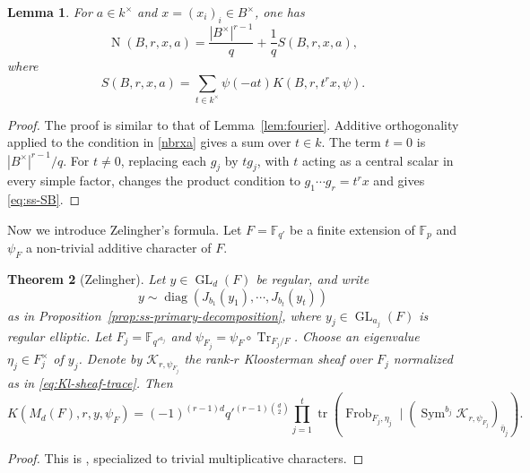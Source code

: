 \documentclass[11pt]{amsart}
\newtheorem{theorem}{Theorem}[section]
\newtheorem{lemma}[theorem]{Lemma}
\theoremstyle{remark}
\newcommand{\F}{\mathbb F}
\newcommand{\Tr}{\operatorname{Tr}}
\newcommand{\Frob}{\operatorname{Frob}}
\newcommand{\Sym}{\operatorname{Sym}}
\newcommand{\cK}{\mathcal K}
\def\GL{\operatorname{GL}}
\newcommand{\Nm}{\operatorname{N}}
\begin{document}
\begin{lemma}\label{lem:ss-fourier}
For $a\in k^{\times}$ and $x=(x_i)_i\in B^{\times}$, one has
\begin{equation}\label{eq:ss-fourier}
 \Nm(B,r,x,a)=\frac{|B^{\times}|^{r-1}}{q}+\frac{1}{q}S(B,r,x,a),
\end{equation}
where
\begin{equation}\label{eq:ss-SB}
 S(B,r,x,a)=\sum_{t\in k^{\times}}\psi(-at)K(B,r,t^r x,\psi).
\end{equation}
\end{lemma}

\begin{proof}
The proof is similar to that of Lemma~\ref{lem:fourier}. Additive orthogonality applied to the condition in \eqref{nbrxa}
gives a sum over $t\in k$. The term $t=0$ is
$|B^{\times}|^{r-1}/q$. For $t\neq 0$, replacing each $g_j$ by $tg_j$, with
$t$ acting as a central scalar in every simple factor, changes the product
condition to $g_1\cdots g_r=t^r x$ and gives \eqref{eq:ss-SB}. 
\end{proof}

Now we introduce Zelingher's formula. Let $F=\F_{q'}$ be a finite extension of $\F_p$ and $\psi_F$ a non-trivial additive character of $F$.

\begin{theorem}[Zelingher]\label{thm:ss-zelingher}
Let $y\in\GL_d(F)$ be regular, and write
\[
y\sim\operatorname{diag}\left(J_{b_1}(y_1),\cdots,J_{b_t}(y_t)\right)
\]
as in Proposition~\ref{prop:ss-primary-decomposition}, where
$y_j\in\GL_{a_j}(F)$ is regular elliptic. Let $F_j=\F_{{q'}^{a_j}}$ and $\psi_{F_j}=\psi_F\circ\Tr_{F_j/F}$. Choose an eigenvalue $\eta_j\in F_j^\times$ of $y_j$. Denote by
$\cK_{r,\psi_{F_j}}$ the rank-$r$ Kloosterman sheaf over $F_j$ normalized as in \eqref{eq:Kl-sheaf-trace}. Then
\begin{equation}\label{eq:ss-zelingher}
K(M_d(F),r,y,\psi_F)=(-1)^{(r-1)d}{q'}^{(r-1)\binom d2}\prod_{j=1}^{t}
\operatorname{tr}\left(\Frob_{F_j,\eta_j}\mid
(\Sym^{b_j}\cK_{r,\psi_{F_j}})_{\bar{\eta}_j}\right).
\end{equation}
\end{theorem}

\begin{proof}
This is \cite[Corollary~4.7]{ZelingherMatrix}, specialized to trivial multiplicative characters. 
\end{proof}
\end{document}
